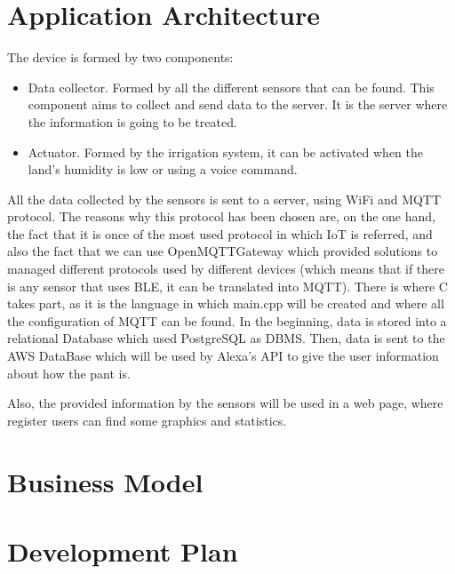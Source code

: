 \documentclass[english,runningheads,a4paper]{llncs}[2018/03/10]
\begin{document}

\section*{Application Architecture}
The device is formed by two components:
\begin{itemize}
\item Data collector. Formed by all the different sensors that can be found. This component aims to collect and send data to the server. It is the server where the information is going to be treated.
\item Actuator. Formed by the irrigation system, it can be activated when the land's humidity is low or using a voice command. 
\end{itemize}

All the data collected by the sensors is sent to a server, using WiFi and
MQTT protocol. The reasons why this protocol has been chosen are, on the 
one hand, the fact that it is once of the most used protocol in which IoT is referred,
and also the fact that we can use OpenMQTTGateway which provided 
solutions to managed different protocols used by different devices (which means that if there is any sensor that uses BLE, it can be translated into MQTT). 
There is where C takes part, as it is the language in which main.cpp will be created and where all the configuration of MQTT can be found. In the beginning,
data is stored into a relational Database which used PostgreSQL as DBMS. Then, data is sent to the AWS DataBase which will be used by Alexa's API to give
the user information about how the pant is.

Also, the provided information by the sensors will be used in a web page, where register users can find some graphics and statistics.


\section*{Business Model}


\section*{Development Plan}
\end{document}
